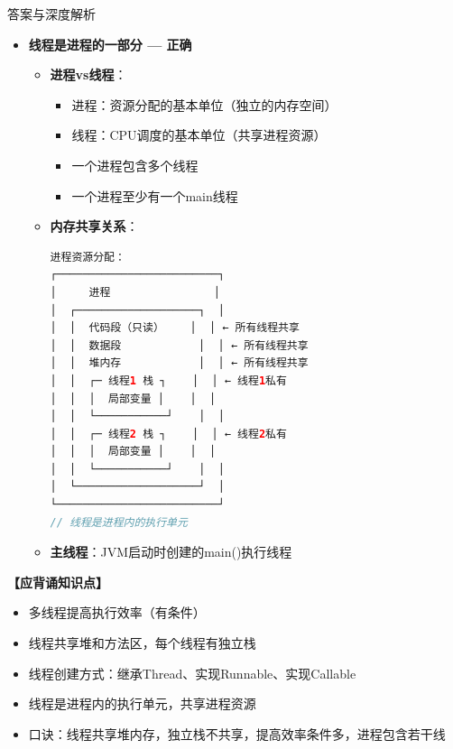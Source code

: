 \documentclass[12pt, a4paper]{ctexart}
\begin{document}
\begin{enumerate}[label=\textbf{\arabic*.}]
\begin{bluebox}{答案与深度解析}
\begin{itemize}[leftmargin=*, nosep, label={}]
\begin{itemize}[label={}, leftmargin=*, nosep]
\begin{lstlisting}[language=Java]
// 使用
FutureTask<Integer> future = new FutureTask<>(new MyCallable());
new Thread(future).start();
Integer result = future.get();  // 获取返回值
// Callable支持返回值和抛出异常
				            \end{lstlisting}
			            \end{itemize}

			      \item[D] \textbf{线程是进程的一部分 — 正确}
			            \begin{itemize}[label={}, leftmargin=*, nosep]
				            \item \textbf{进程vs线程}：
				                  \begin{itemize}[label={}, nosep]
					                  \item 进程：资源分配的基本单位（独立的内存空间）
					                  \item 线程：CPU调度的基本单位（共享进程资源）
					                  \item 一个进程包含多个线程
					                  \item 一个进程至少有一个main线程
				                  \end{itemize}
				            \item \textbf{内存共享关系}：
				                  \begin{lstlisting}[language=Java]
进程资源分配：
┌─────────────────────────┐
│     进程                │
│  ┌───────────────────┐  │
│  │  代码段（只读）    │  │ ← 所有线程共享
│  │  数据段            │  │ ← 所有线程共享
│  │  堆内存            │  │ ← 所有线程共享
│  │  ┌─ 线程1 栈 ┐    │  │ ← 线程1私有
│  │  │  局部变量 │    │  │
│  │  └───────────┘    │  │
│  │  ┌─ 线程2 栈 ┐    │  │ ← 线程2私有
│  │  │  局部变量 │    │  │
│  │  └───────────┘    │  │
│  └───────────────────┘  │
└─────────────────────────┘
// 线程是进程内的执行单元
					      \end{lstlisting}
				            \item \textbf{主线程}：JVM启动时创建的main()执行线程
			            \end{itemize}
		      \end{itemize}

		      \textbf{【应背诵知识点】}
		      \begin{itemize}[label={}, nosep]
			      \item 多线程提高执行效率（有条件）
			      \item 线程共享堆和方法区，每个线程有独立栈
			      \item 线程创建方式：继承Thread、实现Runnable、实现Callable
			      \item 线程是进程内的执行单元，共享进程资源
			      \item 口诀：线程共享堆内存，独立栈不共享，提高效率条件多，进程包含若干线
		      \end{itemize}


\end{bluebox}
\end{enumerate}
\end{document}
